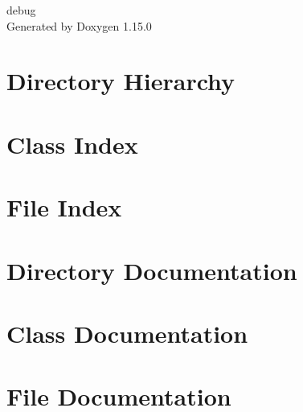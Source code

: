 \documentclass[twoside]{book}
\newcommand{\+}{\discretionary{\mbox{\scriptsize$\hookleftarrow$}}{}{}}
\newcommand{\clearemptydoublepage}{%
    \newpage{\pagestyle{empty}\cleardoublepage}%
  }
\begin{document}
  \raggedbottom
    \hypersetup{pageanchor=false,
                bookmarksnumbered=true,
                pdfencoding=unicode
               }
  \begin{titlepage}
  \vspace*{7cm}
  \begin{center}%
  {\Large debug}\\
  \vspace*{1cm}
  {\large Generated by Doxygen 1.15.0}\\
  \end{center}
  \end{titlepage}
  \clearemptydoublepage
  \tableofcontents
  \clearemptydoublepage
  \hypersetup{pageanchor=true}



\chapter{Directory Hierarchy}

\chapter{Class Index}

\chapter{File Index}

\chapter{Directory Documentation}


\chapter{Class Documentation}






\chapter{File Documentation}









  \backmatter
  \newpage
  \clearemptydoublepage
  \printindex
\end{document}
